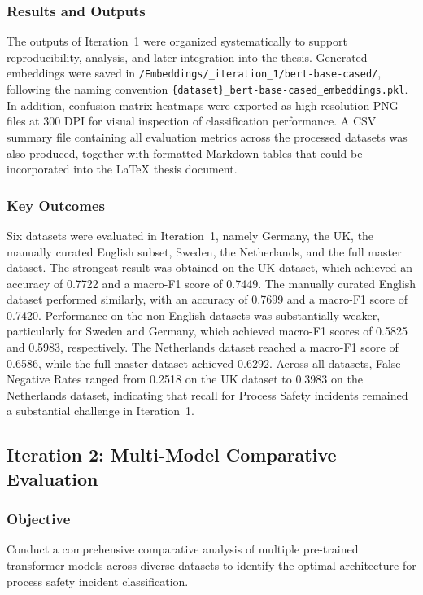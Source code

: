\documentclass[11pt, titlepage, bibliography=totoc]{scrreprt}
\begin{document}
\subsubsection{Results and Outputs}
The outputs of Iteration~1 were organized systematically to support reproducibility, analysis, and later integration into the thesis. Generated embeddings were saved in \texttt{/Embeddings/\_iteration\_1/bert-base-cased/}, following the naming convention \texttt{\{dataset\}\_bert-base-cased\_embeddings.pkl}. In addition, confusion matrix heatmaps were exported as high-resolution PNG files at 300 DPI for visual inspection of classification performance. A CSV summary file containing all evaluation metrics across the processed datasets was also produced, together with formatted Markdown tables that could be incorporated into the LaTeX thesis document.

\subsubsection{Key Outcomes}
Six datasets were evaluated in Iteration~1, namely Germany, the UK, the manually curated English subset, Sweden, the Netherlands, and the full master dataset. The strongest result was obtained on the UK dataset, which achieved an accuracy of 0.7722 and a macro-F1 score of 0.7449. The manually curated English dataset performed similarly, with an accuracy of 0.7699 and a macro-F1 score of 0.7420. Performance on the non-English datasets was substantially weaker, particularly for Sweden and Germany, which achieved macro-F1 scores of 0.5825 and 0.5983, respectively. The Netherlands dataset reached a macro-F1 score of 0.6586, while the full master dataset achieved 0.6292. Across all datasets, False Negative Rates ranged from 0.2518 on the UK dataset to 0.3983 on the Netherlands dataset, indicating that recall for Process Safety incidents remained a substantial challenge in Iteration~1.

\subsection{Iteration 2: Multi-Model Comparative Evaluation}

\subsubsection{Objective}
Conduct a comprehensive comparative analysis of multiple pre-trained transformer models across diverse datasets to identify the optimal architecture for process safety incident classification.
\end{document}
